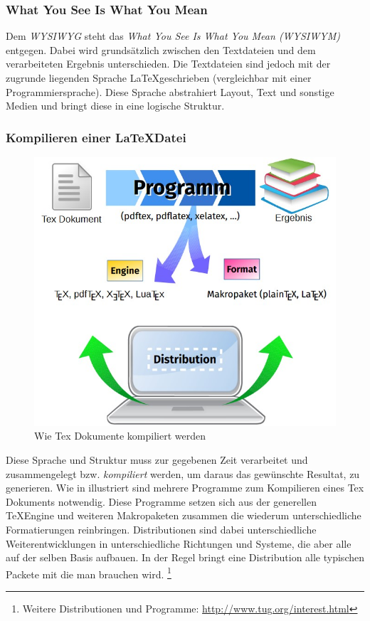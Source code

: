 \subsubsection{What You See Is What You Mean}
Dem \textit{WYSIWYG} steht das \textit{What You See Is What You Mean (WYSIWYM)} entgegen. Dabei wird grundsätzlich zwischen den Textdateien und dem verarbeiteten Ergebnis unterschieden. Die Textdateien sind jedoch mit der zugrunde liegenden Sprache \LaTeX geschrieben (vergleichbar mit einer Programmiersprache). Diese Sprache abstrahiert Layout, Text und sonstige Medien und bringt diese in eine logische Struktur.

\subsubsection{Kompilieren einer \LaTeX Datei}
\begin{figure}[h]
    \centering
    \includegraphics[scale=0.5]{bilder/latex-compiler.jpg}
    \caption{Wie Tex Dokumente kompiliert werden}
    \label{fig.kompiler}
\end{figure}

Diese Sprache und Struktur muss zur gegebenen Zeit verarbeitet und zusammengelegt bzw. \textit{kompiliert} werden, um daraus das gewünschte Resultat, zu generieren. Wie in illustriert sind mehrere Programme zum Kompilieren eines Tex Dokuments notwendig.
Diese Programme setzen sich aus der generellen \TeX Engine und weiteren Makropaketen zusammen die wiederum unterschiedliche Formatierungen reinbringen.
Distributionen sind dabei unterschiedliche Weiterentwicklungen in unterschiedliche Richtungen und Systeme, die aber alle auf der selben Basis aufbauen. In der Regel bringt eine Distribution alle typischen Packete mit die man brauchen wird.
\footnote{Weitere Distributionen und Programme: \url{http://www.tug.org/interest.html}}


